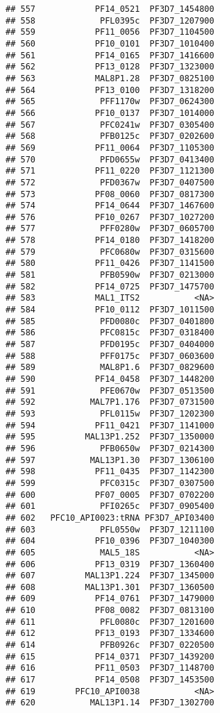 \documentclass{article}\usepackage[]{graphicx}\usepackage[]{color}
\makeatletter
\newenvironment{kframe}{%
 \def\at@end@of@kframe{}%
 \ifinner\ifhmode%
  \def\at@end@of@kframe{\end{minipage}}%
  \begin{minipage}{\columnwidth}%
 \fi\fi%
 \def\FrameCommand##1{\hskip\@totalleftmargin \hskip-\fboxsep
 \colorbox{shadecolor}{##1}\hskip-\fboxsep
     \hskip-\linewidth \hskip-\@totalleftmargin \hskip\columnwidth}%
 \MakeFramed {\advance\hsize-\width
   \@totalleftmargin\z@ \linewidth\hsize
   \@setminipage}}%
 {\par\unskip\endMakeFramed%
 \at@end@of@kframe}
\newenvironment{knitrout}{}{} %
\makeatother
\begin{document}
\begin{knitrout}
\begin{kframe}
\begin{verbatim}
## 557            PF14_0521  PF3D7_1454800
## 558             PFL0395c  PF3D7_1207900
## 559            PF11_0056  PF3D7_1104500
## 560            PF10_0101  PF3D7_1010400
## 561            PF14_0165  PF3D7_1416600
## 562            PF13_0128  PF3D7_1323000
## 563            MAL8P1.28  PF3D7_0825100
## 564            PF13_0100  PF3D7_1318200
## 565             PFF1170w  PF3D7_0624300
## 566            PF10_0137  PF3D7_1014000
## 567             PFC0241w  PF3D7_0305400
## 568             PFB0125c  PF3D7_0202600
## 569            PF11_0064  PF3D7_1105300
## 570             PFD0655w  PF3D7_0413400
## 571            PF11_0220  PF3D7_1121300
## 572             PFD0367w  PF3D7_0407500
## 573            PF08_0060  PF3D7_0817300
## 574            PF14_0644  PF3D7_1467600
## 576            PF10_0267  PF3D7_1027200
## 577             PFF0280w  PF3D7_0605700
## 578            PF14_0180  PF3D7_1418200
## 579             PFC0680w  PF3D7_0315600
## 580            PF11_0426  PF3D7_1141500
## 581             PFB0590w  PF3D7_0213000
## 582            PF14_0725  PF3D7_1475700
## 583            MAL1_ITS2           <NA>
## 584            PF10_0112  PF3D7_1011500
## 585             PFD0080c  PF3D7_0401800
## 586             PFC0815c  PF3D7_0318400
## 587             PFD0195c  PF3D7_0404000
## 588             PFF0175c  PF3D7_0603600
## 589             MAL8P1.6  PF3D7_0829600
## 590            PF14_0458  PF3D7_1448200
## 591             PFE0670w  PF3D7_0513500
## 592           MAL7P1.176  PF3D7_0731500
## 593             PFL0115w  PF3D7_1202300
## 594            PF11_0421  PF3D7_1141000
## 595          MAL13P1.252  PF3D7_1350000
## 596             PFB0650w  PF3D7_0214300
## 597           MAL13P1.30  PF3D7_1306100
## 598            PF11_0435  PF3D7_1142300
## 599             PFC0315c  PF3D7_0307500
## 600            PF07_0005  PF3D7_0702200
## 601             PFI0265c  PF3D7_0905400
## 602   PFC10_API0023:tRNA PF3D7_API03400
## 603             PFL0550w  PF3D7_1211100
## 604            PF10_0396  PF3D7_1040300
## 605             MAL5_18S           <NA>
## 606            PF13_0319  PF3D7_1360400
## 607          MAL13P1.224  PF3D7_1345000
## 608          MAL13P1.301  PF3D7_1360500
## 609            PF14_0761  PF3D7_1479000
## 610            PF08_0082  PF3D7_0813100
## 611             PFL0080c  PF3D7_1201600
## 612            PF13_0193  PF3D7_1334600
## 614             PFB0926c  PF3D7_0220500
## 615            PF14_0371  PF3D7_1439200
## 616            PF11_0503  PF3D7_1148700
## 617            PF14_0508  PF3D7_1453500
## 619        PFC10_API0038           <NA>
## 620           MAL13P1.14  PF3D7_1302700

\end{verbatim}
\end{kframe}
\end{knitrout}
\end{document}
